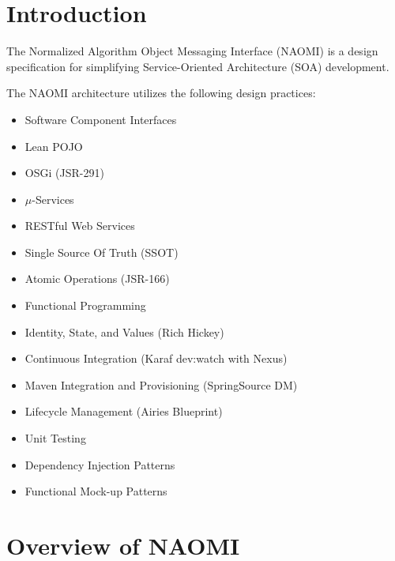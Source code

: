 \documentclass{article}[11pt]
\begin{document}
\section{Introduction}

\par
The Normalized Algorithm Object Messaging Interface (NAOMI) is a design specification for simplifying Service-Oriented Architecture (SOA) development.

\par
The NAOMI architecture utilizes the following design practices:
\begin{itemize}
  \item Software Component Interfaces
  \item Lean POJO
  \item OSGi (JSR-291)
  \item $\mu$-Services
  \item RESTful Web Services
  \item Single Source Of Truth (SSOT)
  \item Atomic Operations (JSR-166)
  \item Functional Programming
  \item Identity, State, and Values (Rich Hickey)
  \item Continuous Integration (Karaf dev:watch with Nexus)
  \item Maven Integration and Provisioning (SpringSource DM)
  \item Lifecycle Management (Airies Blueprint)
  \item Unit Testing
  \item Dependency Injection Patterns
  \item Functional Mock-up Patterns
\end{itemize}

\section{Overview of NAOMI}
\end{document}
